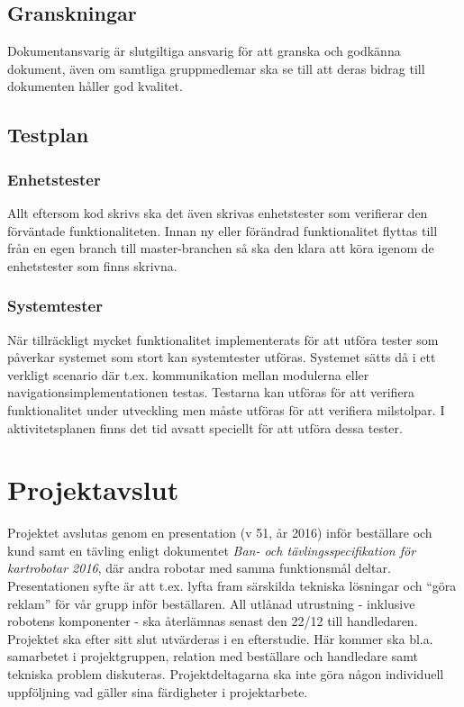 \documentclass{article}
\begin{document}
\subsection{Granskningar}
Dokumentansvarig är slutgiltiga ansvarig för att granska och godkänna dokument, även om samtliga gruppmedlemar ska se till att deras bidrag till dokumenten håller god kvalitet.

\subsection{Testplan}
\subsubsection{Enhetstester}
Allt eftersom kod skrivs ska det även skrivas enhetstester som verifierar den förväntade funktionaliteten. Innan ny eller förändrad funktionalitet flyttas till från en egen branch till master-branchen så ska den klara att köra igenom de enhetstester som finns skrivna.

\subsubsection{Systemtester}
När tillräckligt mycket funktionalitet implementerats för att utföra tester som påverkar systemet som stort kan systemtester utföras. Systemet sätts då i ett verkligt scenario där t.ex. kommunikation mellan modulerna eller navigationsimplementationen testas. Testarna kan utföras för att verifiera funktionalitet under utveckling men måste utföras för att verifiera milstolpar. I aktivitetsplanen finns det tid avsatt speciellt för att utföra dessa tester.

\section{Projektavslut}
Projektet avslutas genom en presentation (v 51, år 2016) inför beställare och kund samt en tävling enligt dokumentet \textit{Ban- och tävlingsspecifikation för kartrobotar 2016}, där andra robotar med samma funktionsmål deltar. Presentationen syfte är att t.ex. lyfta fram särskilda tekniska lösningar och ``göra reklam'' för vår grupp inför beställaren. All utlånad utrustning - inklusive robotens komponenter - ska återlämnas senast den 22/12 till handledaren. Projektet ska efter sitt slut utvärderas i en efterstudie. Här kommer ska bl.a. samarbetet i projektgruppen, relation med beställare och handledare samt tekniska problem diskuteras. Projektdeltagarna ska inte göra någon individuell uppföljning vad gäller sina färdigheter i projektarbete.
\end{document}
